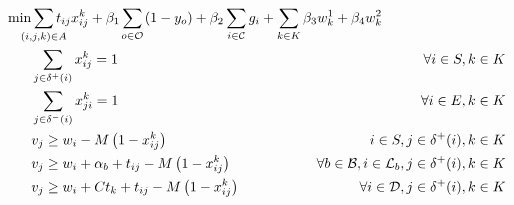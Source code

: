 \documentclass{article}
\begin{document}
\begin{alignat}{3}
    \label{mod:obj}   \min & \smashoperator{ \sum_{ \substack{(i,j,k) \in A} }} {t_{ij}x^{k}_{ij}} + \beta_1\smashoperator{\sum_{ o \in \mathcal{O}}}{  \left(1-y_o\right)} \hspace{-0mm}  + \beta_2 \smashoperator{ \sum_{i \in \mathcal{C} } } { g_i  } +  \sum_{k \in K}{\beta_3 w^{1}_k } + \beta_4 { w^{2}_k } &                                                                                                  \\
    \label{mod:c1}         & \sum_{j \in \delta^{+}(i) }{x^k_{ij}} =1                                                                                                                                                                                                                                               & \forall i \in S, k \in K                                                                         \\
    \label{mod:c2}         & \sum_{j \in \delta^{-}(i)}{x^k_{ji}} = 1                                                                                                                                                                                                                                               & \forall i \in E, k \in K                                                                         \\
    \label{mod:c03}        & v_j \geq  w_i  - M\left(1-x^{k}_{ij}\right)                                                                                                                                                                                                                                            & \hspace{-20mm}  i \in S, j \in \delta^{+}(i),  k \in K                                           \\
    \label{mod:c3}         & v_j \geq  w_i + \alpha_{b} + t_{ij} - M\left(1-x^{k}_{ij}\right)                                                                                                                                                                                                                       & \hspace{-20mm} \forall b \in \mathcal{B}, i \in \mathcal{L}_b, j \in \delta^{+}(i),  k \in K     \\
    \label{mod:c4}         & v_j \geq  w_i + Ct_{k} + t_{ij} - M\left(1-x^{k}_{ij}\right)                                                                                                                                                                                                                           & \hspace{-20mm} \forall i \in \mathcal{D}  , j \in \delta^{+}(i), k \in K                         \\

\end{alignat}
\end{document}
